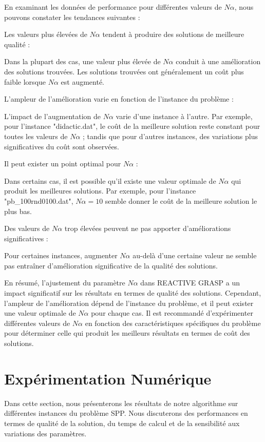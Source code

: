 \documentclass[12pt]{article}
\begin{document}
En examinant les données de performance pour différentes valeurs de \(N\alpha\), nous pouvons constater les tendances suivantes :

Les valeurs plus élevées de \(N\alpha\) tendent à produire des solutions de meilleure qualité :

Dans la plupart des cas, une valeur plus élevée de \(N\alpha\) conduit à une amélioration des solutions trouvées. Les solutions trouvées ont généralement un coût plus faible lorsque \(N\alpha\) est augmenté.

L'ampleur de l'amélioration varie en fonction de l'instance du problème :

L'impact de l'augmentation de \(N\alpha\) varie d'une instance à l'autre. Par exemple, pour l'instance "didactic.dat", le coût de la meilleure solution reste constant pour toutes les valeurs de \(N\alpha\) ; tandis que pour d'autres instances, des variations plus significatives du coût sont observées.

Il peut exister un point optimal pour \(N\alpha\) :

Dans certains cas, il est possible qu'il existe une valeur optimale de \(N\alpha\) qui produit les meilleures solutions. Par exemple, pour l'instance "pb_100rnd0100.dat", \(N\alpha = 10\) semble donner le coût de la meilleure solution le plus bas.

Des valeurs de \(N\alpha\) trop élevées peuvent ne pas apporter d'améliorations significatives :

Pour certaines instances, augmenter \(N\alpha\) au-delà d'une certaine valeur ne semble pas entraîner d'amélioration significative de la qualité des solutions.

En résumé, l'ajustement du paramètre \(N\alpha\) dans REACTIVE GRASP a un impact significatif sur les résultats en termes de qualité des solutions. Cependant, l'ampleur de l'amélioration dépend de l'instance du problème, et il peut exister une valeur optimale de \(N\alpha\) pour chaque cas. Il est recommandé d'expérimenter différentes valeurs de \(N\alpha\) en fonction des caractéristiques spécifiques du problème pour déterminer celle qui produit les meilleurs résultats en termes de coût des solutions.

\section{Expérimentation Numérique}
Dans cette section, nous présenterons les résultats de notre algorithme sur différentes instances du problème SPP. Nous discuterons des performances en termes de qualité de la solution, du temps de calcul et de la sensibilité aux variations des paramètres.
\end{document}
